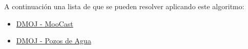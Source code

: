 A continuación una lista de que se pueden resolver aplicando este algoritmo:

\begin{itemize}
	\item \href{https://dmoj.uclv.edu.cu/problem/moocast}{DMOJ - MooCast}
	\item \href{https://dmoj.uclv.edu.cu/problem/water}{DMOJ - Pozos de Agua}
\end{itemize}